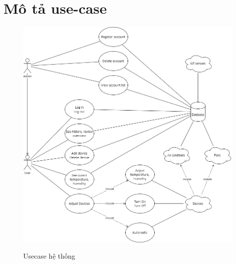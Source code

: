 \section{Mô tả use-case}
\begin{figure}[tph]
	\includegraphics[width=\columnwidth]{Images/Usecase} \\
	\caption{Usecase hệ thống}
	\label{fig:Usecase}
\end{figure} 
